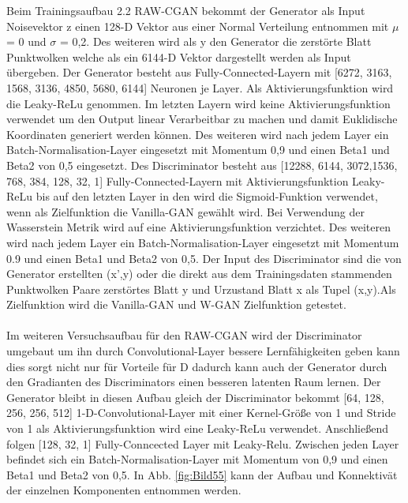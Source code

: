 \documentclass{llncs}
\begin{document}
Beim Trainingsaufbau 2.2 RAW-CGAN bekommt der Generator als Input Noisevektor z einen 128-D Vektor aus einer  Normal Verteilung entnommen mit $\mu$ =  0 und $\sigma$ =  0,2. Des weiteren wird als y den Generator die  zerstörte Blatt Punktwolken welche als ein 6144-D Vektor dargestellt werden als Input übergeben. Der Generator besteht aus Fully-Connected-Layern mit [6272, 3163, 1568, 3136, 4850, 5680, 6144] Neuronen je Layer. Als Aktivierungsfunktion wird die Leaky-ReLu genommen. Im letzten Layern wird keine Aktivierungsfunktion verwendet um den Output linear Verarbeitbar zu machen und damit Euklidische Koordinaten generiert werden können. Des weiteren wird nach jedem Layer ein Batch-Normalisation-Layer eingesetzt mit Momentum 0,9 und einen Beta1 und Beta2 von 0,5 eingesetzt. Des Discriminator besteht aus [12288, 6144, 3072,1536, 768, 384, 128, 32, 1] Fully-Connected-Layern mit Aktivierungsfunktion Leaky-ReLu bis auf den letzten Layer in den wird die Sigmoid-Funktion verwendet, wenn als Zielfunktion die Vanilla-GAN gewählt wird. Bei Verwendung der Wasserstein Metrik wird auf eine Aktivierungsfunktion verzichtet. Des weiteren wird nach jedem Layer ein Batch-Normalisation-Layer eingesetzt mit Momentum 0.9 und einen Beta1 und Beta2 von 0,5. Der Input des Discriminator sind die von Generator erstellten (x',y) oder die direkt aus dem Trainingsdaten stammenden Punktwolken Paare zerstörtes Blatt y und Urzustand Blatt x als Tupel (x,y).Als Zielfunktion wird die Vanilla-GAN und W-GAN Zielfunktion getestet.
\\\\
Im weiteren Versuchsaufbau für den RAW-CGAN wird der Discriminator umgebaut um ihn durch Convolutional-Layer bessere Lernfähigkeiten geben kann dies sorgt nicht nur für Vorteile für D dadurch kann auch der Generator durch den Gradianten des Discriminators einen besseren latenten Raum lernen. Der Generator bleibt in diesen Aufbau gleich der Discriminator bekommt [64, 128, 256, 256, 512] 1-D-Convolutional-Layer mit einer Kernel-Größe von 1 und Stride von 1 als Aktivierungsfunktion wird eine Leaky-ReLu verwendet. Anschließend folgen [128, 32, 1] Fully-Conncected Layer mit Leaky-Relu. Zwischen jeden Layer befindet sich ein Batch-Normalisation-Layer mit Momentum von 0,9 und einen Beta1 und Beta2 von 0,5. In Abb. \ref{fig:Bild55} kann der Aufbau und Konnektivät der einzelnen Komponenten entnommen werden.
\end{document}
